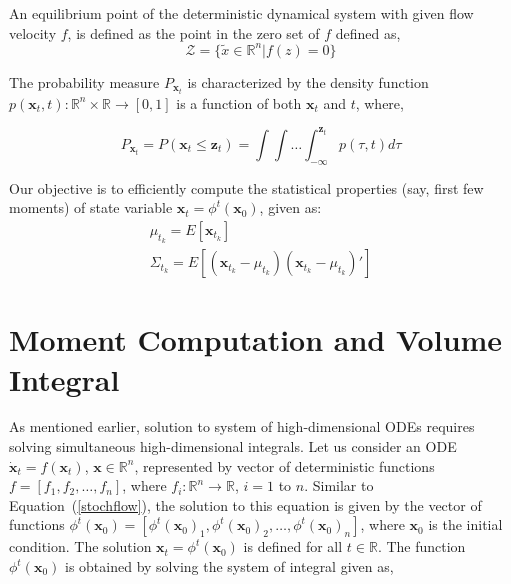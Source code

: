 \noindent An equilibrium point of the deterministic dynamical system with given flow velocity $f$, is defined as the point in the zero set of $f$ defined as,
\begin{equation}
\mathcal{Z} = \lbrace \tilde{x} \in \mathbb{R}^n | f(z) = 0 \rbrace
\end{equation}

The probability measure $P_{\textbf{x}_t}$ is characterized by the density function $p(\textbf{x}_t,t): \mathbb{R}^n \times \mathbb{R} \rightarrow [0,1]$ is a function of both $\textbf{x}_t$ and $t$, where,                     

\begin{equation}
\label{pdf_func}
P_{\textbf{x}_t} = P(\textbf{x}_t \leq \textbf{z}_t) = \int \int \ldots \int_{-\infty} ^{\textbf{z}_t} p(\tau,t) d\tau
\end{equation}

Our objective is to efficiently compute the statistical properties (say, first few moments) of state variable $\mathbf{x}_t = \phi^t(\mathbf{x}_0)$, given as:
\begin{equation}
\label{moments}
\begin{array}{l}
\mu_{t_k} = E[\mathbf{x}_{t_k}]  \\
\Sigma_{t_k} = E\left[(\mathbf{x}_{t_k} - \mu_{t_k})(\mathbf{x}_{t_k} - \mu_{t_k})'\right]
\end{array}
\end{equation}

\section{Moment Computation and Volume Integral}

\label{volume_integral}
As mentioned earlier, solution to system of high-dimensional ODEs requires solving simultaneous high-dimensional integrals. Let us consider an ODE $\dot{\textbf{x}}_t = f(\textbf{x}_t)$, $\textbf{x} \in \mathbb{R}^n$, represented by vector of deterministic functions $f = [f_1,f_2,\ldots,f_n]$, where $f_i:\mathbb{R}^n \rightarrow \mathbb{R}$, $i = 1$ to $n$. Similar to Equation~(\ref{stochflow}), the solution to this equation is given by the vector of functions $\phi^t(\textbf{x}_0) = [\phi^t(\textbf{x}_0)_1, \phi^t(\textbf{x}_0)_2, \ldots, \phi^t(\textbf{x}_0)_n]$, where $\textbf{x}_0$ is the initial condition. The solution $\textbf{x}_t = \phi^t(\textbf{x}_0)$ is defined for all $t \in \mathbb{R}$. The function $\phi^t(\textbf{x}_0)$ is obtained by solving the system of integral given as,

